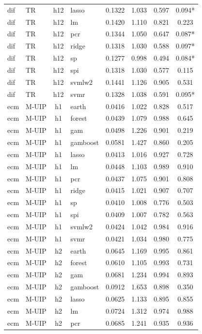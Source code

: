 \begin{ThreePartTable}
\begin{longtable}[t]{llclcccc}
dif & TR & h12 & lasso & 0.1322 & 1.033 & 0.597 & 0.094*\\
dif & TR & h12 & lm & 0.1420 & 1.110 & 0.821 & 0.223\\
dif & TR & h12 & pcr & 0.1344 & 1.050 & 0.647 & 0.087*\\
dif & TR & h12 & ridge & 0.1318 & 1.030 & 0.588 & 0.097*\\
dif & TR & h12 & sp & 0.1277 & 0.998 & 0.494 & 0.084*\\
dif & TR & h12 & spi & 0.1318 & 1.030 & 0.577 & 0.115\\
dif & TR & h12 & svmlw2 & 0.1441 & 1.126 & 0.905 & 0.531\\
dif & TR & h12 & svmr & 0.1328 & 1.038 & 0.591 & 0.095*\\
\addlinespace
ecm & M-UIP & h1 & earth & 0.0416 & 1.022 & 0.828 & 0.517\\
ecm & M-UIP & h1 & forest & 0.0439 & 1.079 & 0.988 & 0.645\\
ecm & M-UIP & h1 & gam & 0.0498 & 1.226 & 0.901 & 0.219\\
ecm & M-UIP & h1 & gamboost & 0.0581 & 1.427 & 0.860 & 0.205\\
ecm & M-UIP & h1 & lasso & 0.0413 & 1.016 & 0.927 & 0.728\\
ecm & M-UIP & h1 & lm & 0.0448 & 1.103 & 0.989 & 0.910\\
ecm & M-UIP & h1 & pcr & 0.0437 & 1.075 & 0.901 & 0.808\\
ecm & M-UIP & h1 & ridge & 0.0415 & 1.021 & 0.907 & 0.707\\
ecm & M-UIP & h1 & sp & 0.0410 & 1.008 & 0.776 & 0.503\\
ecm & M-UIP & h1 & spi & 0.0409 & 1.007 & 0.782 & 0.563\\
ecm & M-UIP & h1 & svmlw2 & 0.0424 & 1.042 & 0.984 & 0.916\\
ecm & M-UIP & h1 & svmr & 0.0421 & 1.034 & 0.980 & 0.775\\
\addlinespace
ecm & M-UIP & h2 & earth & 0.0645 & 1.169 & 0.995 & 0.861\\
ecm & M-UIP & h2 & forest & 0.0610 & 1.105 & 0.993 & 0.731\\
ecm & M-UIP & h2 & gam & 0.0681 & 1.234 & 0.994 & 0.893\\
ecm & M-UIP & h2 & gamboost & 0.0912 & 1.653 & 0.898 & 0.350\\
ecm & M-UIP & h2 & lasso & 0.0625 & 1.133 & 0.895 & 0.855\\
ecm & M-UIP & h2 & lm & 0.0724 & 1.312 & 0.974 & 0.988\\
ecm & M-UIP & h2 & pcr & 0.0685 & 1.241 & 0.935 & 0.936\\

\end{longtable}
\end{ThreePartTable}
